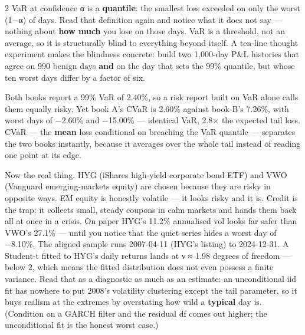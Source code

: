 \documentclass{pyportfolios-note}
\begin{document}
\begin{multicols}{2}
VaR at confidence α is a \textbf{quantile}: the smallest loss exceeded on only
the worst (1−α) of days. Read that definition again and notice what it does not
say — nothing about \textbf{how much} you lose on those days. VaR is a
threshold, not an average, so it is structurally blind to everything beyond
itself. A ten-line thought experiment makes the blindness concrete: build two
1,000-day P\&L histories that agree on 990 benign days \textbf{and} on the day
that sets the 99\% quantile, but whose ten worst days differ by a factor of six.

Both books report a 99\% VaR of 2.40\%, so a risk report built on VaR alone
calls them equally risky. Yet book A's CVaR is 2.60\% against book B's 7.26\%,
with worst days of −2.60\% and −15.00\% — identical VaR, 2.8× the expected tail
loss. CVaR — the \textbf{mean} loss conditional on breaching the VaR quantile —
separates the two books instantly, because it averages over the whole tail
instead of reading one point at its edge.
\end{multicols}


\noteneedroom{190bp}

Now the real thing. HYG (iShares high-yield corporate bond ETF) and VWO
(Vanguard emerging-markets equity) are chosen because they are risky in opposite
ways. EM equity is honestly volatile — it looks risky and it is. Credit is the
trap: it collects small, steady coupons in calm markets and hands them back all
at once in a crisis. On paper HYG's 11.2\% annualised vol looks far safer than
VWO's 27.1\% — until you notice that the quiet series hides a worst day of
−8.10\%. The aligned sample runs 2007-04-11 (HYG's listing) to 2024-12-31. A
Student-t fitted to HYG's daily returns lands at ν ≈ 1.98 degrees of freedom —
below 2, which means the fitted distribution does not even possess a finite
variance. Read that as a diagnostic as much as an estimate: an unconditional iid
fit has nowhere to put 2008's volatility clustering except the tail parameter, so
it buys realism at the extremes by overstating how wild a \textbf{typical} day
is. (Condition on a GARCH filter and the residual df comes out higher; the
unconditional fit is the honest worst case.)
\end{document}

